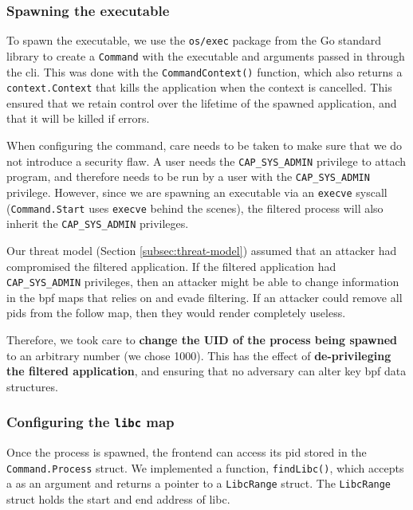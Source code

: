 \subsubsection{Spawning the executable} \label{subsubsec:spawning-exec}

To spawn the executable, we use the \texttt{os/exec} package from the Go
standard library to create a \texttt{Command} with the executable and arguments
passed in through the \ac{cli}. This was done with the \texttt{CommandContext()}
function, which also returns a \texttt{context.Context} that kills the
application when the context is cancelled. This ensured that we retain control
over the lifetime of the spawned application, and that it will be killed if \af
errors.

When configuring the command, care needs to be taken to make sure that we do not 
introduce a security flaw. A user needs the \texttt{CAP\_SYS\_ADMIN} privilege
to attach  program, and therefore \af needs to be run by a user with
the \texttt{CAP\_SYS\_ADMIN} privilege. However, since we are spawning an
executable via an \texttt{execve} syscall (\texttt{Command.Start} uses
\texttt{execve} behind the scenes), the filtered process will also inherit the
\texttt{CAP\_SYS\_ADMIN} privileges.

Our threat model (Section \ref{subsec:threat-model}) assumed that an attacker
had compromised the filtered application. If the filtered application had
\texttt{CAP\_SYS\_ADMIN} privileges, then an attacker might be able to change
information in the \ac{bpf} maps that \af relies on and evade filtering. If an
attacker could remove all \acp{pid} from the follow map, then they would render
\af completely useless. 

Therefore, we took care to \textbf{change the UID of the process being spawned}
to an arbitrary number (we chose 1000). This has the effect of
\textbf{de-privileging the filtered application}, and ensuring that no adversary
can alter key \ac{bpf} data structures.


\subsubsection{Configuring the \texttt{libc} map}
Once the process is spawned, the frontend can access its \ac{pid} stored in the
\texttt{Command.Process} struct. We implemented a function, 
\texttt{findLibc()}, which accepts a  as an argument and returns a pointer to 
a \texttt{LibcRange}  struct. The \texttt{LibcRange} struct holds the start and end 
address of \ac{libc}.

